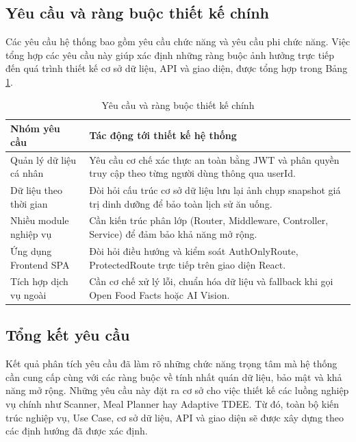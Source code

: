 \documentclass[12pt, a4paper]{report}
\begin{document}
\subsection{Yêu cầu và ràng buộc thiết kế chính}
Các yêu cầu hệ thống bao gồm yêu cầu chức năng và yêu cầu phi chức năng. Việc tổng hợp các yêu cầu này giúp xác định những ràng buộc ảnh hưởng trực tiếp đến quá trình thiết kế cơ sở dữ liệu, API và giao diện, được tổng hợp trong Bảng \ref{tab:yeu_cau_thiet_ke}.

\begin{table}[htbp]
\centering
\caption{Yêu cầu và ràng buộc thiết kế chính}
\label{tab:yeu_cau_thiet_ke}
\renewcommand{\arraystretch}{1.3}
\begin{tabular}{|>{\raggedright\arraybackslash}p{4cm}|>{\raggedright\arraybackslash}p{10.5cm}|}
\hline
\textbf{Nhóm yêu cầu} & \textbf{Tác động tới thiết kế hệ thống} \\
\hline
Quản lý dữ liệu cá nhân & Yêu cầu cơ chế xác thực an toàn bằng JWT và phân quyền truy cập theo từng người dùng thông qua userId. \\
\hline
Dữ liệu theo thời gian & Đòi hỏi cấu trúc cơ sở dữ liệu lưu lại ảnh chụp snapshot giá trị dinh dưỡng để bảo toàn lịch sử ăn uống. \\
\hline
Nhiều module nghiệp vụ & Cần kiến trúc phân lớp (Router, Middleware, Controller, Service) để đảm bảo khả năng mở rộng. \\
\hline
Ứng dụng Frontend SPA & Đòi hỏi điều hướng và kiểm soát AuthOnlyRoute, ProtectedRoute trực tiếp trên giao diện React. \\
\hline
Tích hợp dịch vụ ngoài & Cần cơ chế xử lý lỗi, chuẩn hóa dữ liệu và fallback khi gọi Open Food Facts hoặc AI Vision. \\
\hline
\end{tabular}
\end{table}

\subsection{Tổng kết yêu cầu}
Kết quả phân tích yêu cầu đã làm rõ những chức năng trọng tâm mà hệ thống cần cung cấp cùng với các ràng buộc về tính nhất quán dữ liệu, bảo mật và khả năng mở rộng. Những yêu cầu này đặt ra cơ sở cho việc thiết kế các luồng nghiệp vụ chính như Scanner, Meal Planner hay Adaptive TDEE. Từ đó, toàn bộ kiến trúc nghiệp vụ, Use Case, cơ sở dữ liệu, API và giao diện sẽ được xây dựng theo các định hướng đã được xác định.
\end{document}
